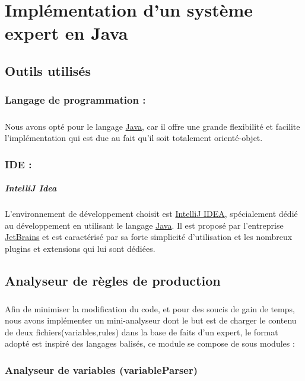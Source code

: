 \chapter{Implémentation d'un système expert en Java}
\section{Outils utilisés}\label{usedTools}
\subsection{Langage de programmation : }
\paragraph{}
Nous avons opté pour le langage \href{https://fr.wikipedia.org/wiki/Java_(technique)}{Java}, car il offre une grande flexibilité et facilite l'implémentation qui est due au fait qu'il soit totalement orienté-objet.
\subsection{IDE : }
\paragraph{IntelliJ Idea} L'environnement de développement choisit est \href{https://www.jetbrains.com/idea/}{IntelliJ IDEA}, spécialement dédié au développement en utilisant le langage \href{https://fr.wikipedia.org/wiki/Java_(technique)}{Java}. Il est proposé par l'entreprise \href{https://www.jetbrains.com}{JetBrains} et est caractérisé par sa forte simplicité d'utilisation et les nombreux plugins et extensions qui lui sont dédiées.
\section{Analyseur de règles de production}
\paragraph{}
Afin de minimiser la modification du code, et pour des soucis de gain de temps, nous avons implémenter un mini-analyseur dont le but est de charger le contenu de deux fichiers(variables,rules) dans la base de faits d'un expert, le format adopté est inspiré des langages balisés, ce module se compose de sous modules : \\
\subsection{Analyseur de variables (variableParser)} \label{varParser}
